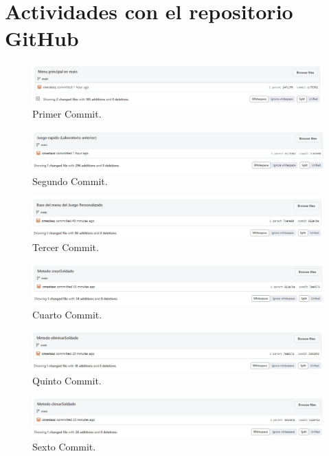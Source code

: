\documentclass{article}
\begin{document}
\section{Actividades con el repositorio GitHub}

\begin{figure}[H]
	\centering
	\includegraphics[width=1\textwidth,keepaspectratio]{img/commit01.jpg}
	\caption{Primer Commit.}
\end{figure}
\begin{figure}[H]
	\centering
	\includegraphics[width=1\textwidth,keepaspectratio]{img/commit02.jpg}
	\caption{Segundo Commit.}
\end{figure}
\begin{figure}[H]
	\centering
	\includegraphics[width=1\textwidth,keepaspectratio]{img/commit03.jpg}
	\caption{Tercer Commit.}
\end{figure}
\begin{figure}[H]
	\centering
	\includegraphics[width=1\textwidth,keepaspectratio]{img/commit04.jpg}
	\caption{Cuarto Commit.}
\end{figure}
\begin{figure}[H]
	\centering
	\includegraphics[width=1\textwidth,keepaspectratio]{img/commit05.jpg}
	\caption{Quinto Commit.}
\end{figure}
\begin{figure}[H]
	\centering
	\includegraphics[width=1\textwidth,keepaspectratio]{img/commit06.jpg}
	\caption{Sexto Commit.}
\end{figure}
\end{document}
